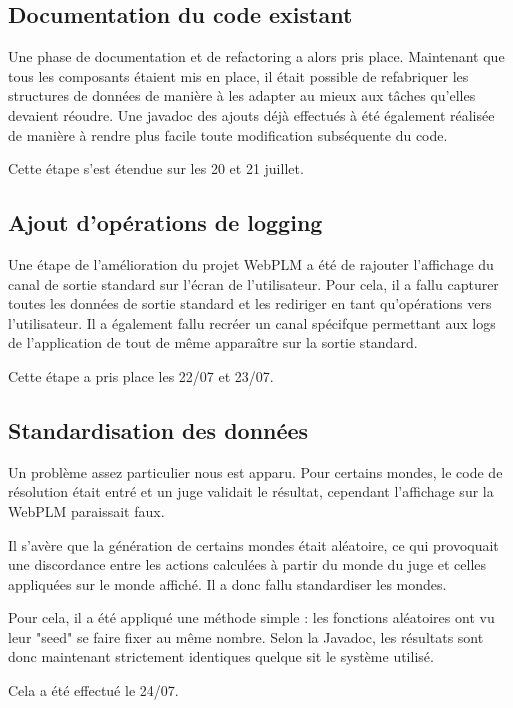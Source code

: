 \documentclass[stage]{tnreport}
\begin{document}
\subsection{Documentation du code existant}

Une phase de documentation et de refactoring a alors pris place. Maintenant que tous les composants étaient mis en place, il était possible de refabriquer les structures de données de manière à les adapter au mieux aux tâches qu'elles devaient réoudre.
Une javadoc des ajouts déjà effectués à été également réalisée de manière à rendre plus facile toute modification subséquente du code.

Cette étape s'est étendue sur les 20 et 21 juillet.

\subsection{Ajout d'opérations de logging}

Une étape de l'amélioration du projet WebPLM a été de rajouter l'affichage du canal de sortie standard sur l'écran de l'utilisateur. Pour cela, il a fallu capturer toutes les données de sortie standard et les rediriger en tant qu'opérations vers l'utilisateur. Il a également fallu recréer un canal spécifque permettant aux logs de l'application de tout de même apparaître sur la sortie standard.

Cette étape a pris place les 22/07 et 23/07.

\subsection{Standardisation des données}

Un problème assez particulier nous est apparu. Pour certains mondes, le code de résolution était entré et un juge validait le résultat, cependant l'affichage sur la WebPLM paraissait faux.

Il s'avère que la génération de certains mondes était aléatoire, ce qui provoquait une discordance entre les actions calculées à partir du monde du juge et celles appliquées sur le monde affiché. Il a donc fallu standardiser les mondes.

Pour cela, il a été appliqué une méthode simple : les fonctions aléatoires ont vu leur "seed" se faire fixer au même nombre. Selon la Javadoc, les résultats sont donc maintenant strictement identiques quelque sit le système utilisé.

Cela a été effectué le 24/07.
\end{document}

